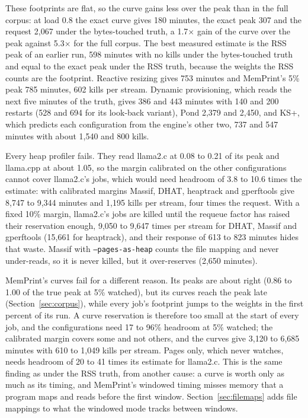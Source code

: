 \documentclass[11pt]{article}
\newcommand{\memprint}{MemPrint}
\newcommand{\secref}[1]{Section~\ref{#1}}
\begin{document}
These footprints are flat, so the curve gains less over the peak than in the full corpus: at load 0.8 the exact
curve gives 180 minutes, the exact peak 307 and the request 2{,}067 under the bytes-touched truth, a 1.7$\times$
gain of the curve over the peak against 5.3$\times$ for the full corpus. The best measured estimate is the RSS
peak of an earlier run, 598 minutes with no kills under the bytes-touched truth and equal to the exact peak under
the RSS truth, because the weights the RSS counts are the footprint. Reactive resizing gives 753 minutes and
\memprint{}'s 5\% peak 785 minutes, 602 kills per stream. Dynamic provisioning, which reads the next five minutes
of the truth, gives 386 and 443 minutes with 140 and 200 restarts (528 and 694 for its look-back variant), Pond 2{,}379 and 2{,}450, and KS+, which
predicts each configuration from the engine's other two, 737 and 547 minutes with about 1{,}540 and 800 kills.

Every heap profiler fails. They read llama2.c at 0.08 to 0.21 of its peak and llama.cpp at about 1.05, so the
margin calibrated on the other configurations cannot cover llama2.c's jobs, which would need headroom of 3.8 to
10.6 times the estimate: with calibrated margins Massif, DHAT, heaptrack and gperftools give 8{,}747 to 9{,}344 minutes and 1{,}195
kills per stream, four times the request. With a fixed 10\% margin, llama2.c's jobs are killed until the requeue
factor has raised their reservation enough, 9{,}050 to 9{,}647 times per stream for DHAT, Massif and gperftools
(15{,}661 for heaptrack), and their response of 613 to 823 minutes hides that waste. Massif with \texttt{--pages-as-heap} counts the file mapping and never under-reads, so it is never
killed, but it over-reserves (2{,}650 minutes).

\memprint{}'s curves fail for a different reason. Its peaks are about right (0.86 to 1.00 of the true peak at 5\%
watched), but its curves reach the peak late (\secref{sec:corpus}), while every job's footprint jumps to the
weights in the first percent of its run. A curve reservation is therefore too small at the start of every job,
and the configurations need 17 to 96\% headroom at 5\% watched; the calibrated margin covers some and not others,
and the curves give 3{,}120 to 6{,}685 minutes with 610 to 1{,}049 kills per stream. Pages only, which never watches,
needs headroom of 20 to 41 times its estimate for llama2.c. This is the same finding as under the RSS truth, from another
cause: a curve is worth only as much as its timing, and \memprint{}'s windowed timing misses memory that a
program maps and reads before the first window. \secref{sec:filemaps} adds file mappings to what the windowed
mode tracks between windows.
\end{document}
